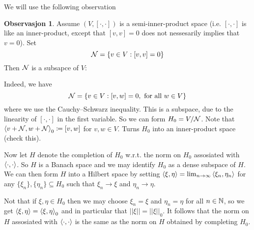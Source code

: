 \documentclass[10pt,english,a4paper]{article}
\theoremstyle{definition}
\newtheorem*{observation}{Observasjon}
\begin{document}
We will use the following observation
\begin{observation}
    Assume $(V,[\cdot,\cdot])$ is a semi-inner-product space 
(i.e. $[\cdot,\cdot]$ is like an inner-product, except that 
$[v,v] = 0$ does not nessesarily implies that $v=0$).
Set 
\[ \mathcal{N} = \{v \in V : [v,v] = 0\} \]
Then $\mathcal{N}$ is a subsapce of $V$:

Indeed, we have 
\[ \mathcal{N} = \{v \in V : [v,w] = 0, \text{ for all }w \in V\} \]
where we use the Cauchy–Schwarz inequality. This is a subspace, due to
the linearity of $[\cdot,\cdot]$ in the first variable.
So we can form $H_0 = V/\mathcal{N}$. Note that 
$\left\langle v +\mathcal{N}, w + \mathcal{N} \right\rangle_0 \coloneqq [v,w]$ for $v,w \in V$. 
Turns $H_0$ into an inner-product space (check this).

Now let $H$ denote the completion of $H_0$ w.r.t. the norm on $H_0$
assosiated with $\left\langle \cdot,\cdot \right\rangle$. So $H$ is a Banach space and we may 
identify $H_0$ as a dense subspace of $H$. We can 
then form $H$ into a Hilbert space by setting 
$\left\langle \xi,\eta \right\rangle = \lim_{n\to\infty} \left\langle \xi_n,\eta_n \right\rangle$ for 
any $\{\xi_n\}, \{\eta_n\}\subseteq H_0$ such that $\xi_n\to \xi$ and 
$\eta_n\to \eta$. 

Not that if $\xi,\eta\in H_0$ then we may choose $\xi_n=\xi$ and $\eta_n =\eta$ for all
$n\in\mathbb{N}$, so we get $\left\langle \xi,\eta \right\rangle = \left\langle \xi,\eta \right\rangle_{0}$ and in particular 
that $||\xi|| = ||\xi||_0$.
It follows that the norm on $H$ assosiated with $\left\langle \cdot,\cdot \right\rangle$ is the same 
as the norm on $H$ obtained by completing $H_0$.

\end{observation}
\end{document}
